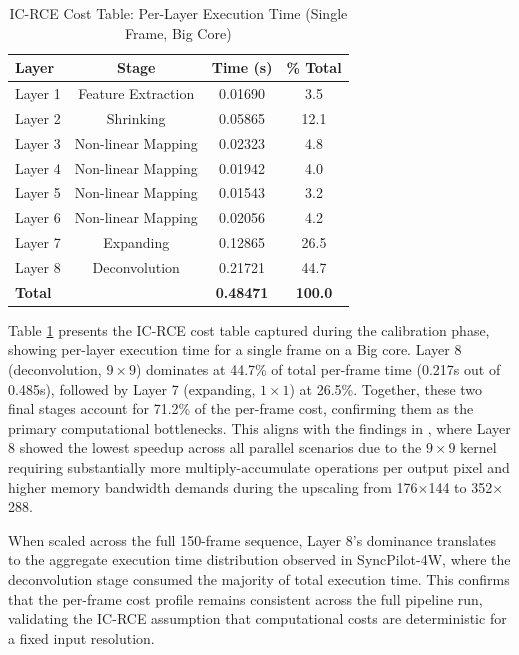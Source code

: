 \documentclass[runningheads]{llncs}
\begin{document}
\begin{table}
\caption{IC-RCE Cost Table: Per-Layer Execution Time (Single Frame, Big Core)}\label{tab:layers}
\centering
\small
\begin{tabular}{|l|c|c|c|}
\hline
\textbf{Layer} & \textbf{Stage} & \textbf{Time (s)} & \textbf{\% Total} \\
\hline
Layer 1 & Feature Extraction & 0.01690 & 3.5 \\
Layer 2 & Shrinking & 0.05865 & 12.1 \\
Layer 3 & Non-linear Mapping & 0.02323 & 4.8 \\
Layer 4 & Non-linear Mapping & 0.01942 & 4.0 \\
Layer 5 & Non-linear Mapping & 0.01543 & 3.2 \\
Layer 6 & Non-linear Mapping & 0.02056 & 4.2 \\
Layer 7 & Expanding & 0.12865 & 26.5 \\
Layer 8 & Deconvolution & 0.21721 & 44.7 \\
\hline
\textbf{Total} & & \textbf{0.48471} & \textbf{100.0} \\
\hline
\end{tabular}
\end{table}


Table \ref{tab:layers} presents the IC-RCE cost table captured during the calibration phase, showing per-layer execution time for a single frame on a Big core. Layer 8 (deconvolution, $9\times9$) dominates at 44.7\% of total per-frame time (0.217s out of 0.485s), followed by Layer 7 (expanding, $1\times1$) at 26.5\%. Together, these two final stages account for 71.2\% of the per-frame cost, confirming them as the primary computational bottlenecks. This aligns with the findings in \cite{annisa2025fsrcnn}, where Layer 8 showed the lowest speedup across all parallel scenarios due to the $9\times9$ kernel requiring substantially more multiply-accumulate operations per output pixel and higher memory bandwidth demands during the upscaling from 176$\times$144 to 352$\times$288.

When scaled across the full 150-frame sequence, Layer 8's dominance translates to the aggregate execution time distribution observed in SyncPilot-4W, where the deconvolution stage consumed the majority of total execution time. This confirms that the per-frame cost profile remains consistent across the full pipeline run, validating the IC-RCE assumption that computational costs are deterministic for a fixed input resolution.
\end{document}
